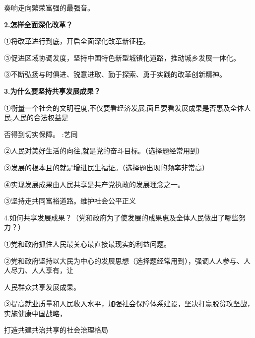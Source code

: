 \documentclass[lang=cn,11pt]{elegantbook}
\newcommand{\daofasym}[1]{{\daofasymbolfont #1}}
\newcommand{\daofasym}[1]{#1}
\begin{document}
奏响走向繁荣富强的最强音。\par

\textbf{2.怎样全面深化改革？}\par

\daofasym{①}将改革进行到底，开启全面深化改革新征程。\par

\daofasym{③}促进区域协调发度，坚持中国特色新型城镇化道路，推动城乡发展一体化。\par

\daofasym{③}不断弘扬与时俱进、锐意进取、勤于探索、勇于实践的改革创新精神。\par

\textbf{3.为什么要坚持共享发展成果？}\par

\daofasym{①}衡量一个社会的文明程度,不仅要看经济发展,面且要看发展成果是否惠及全体人民,人民的合法权益是\par

否得到切实保障。 :艺同\par

\daofasym{②}人民对美好生活的向往,就是党的奋斗目标。（选择题经常用到）\par

\daofasym{③}发展的根本且的就是增进民生福证。（选择题出现的频率非常高）\par

\daofasym{④}实现发展成果由人民共享是共产党执政的发展理念之一。\par

\daofasym{③}坚持走共同富裕道路。维护社会公平正义\par

4.如何共享发展成果？（党和政府为了使发展的成果惠及全体人民做出了哪些努力？）\par

\daofasym{①}党和政府抓住人民最关心最直接最现实的利益问题。\par

\daofasym{②}党和政府坚持以大民为中心的发展思想（选择题经常用到），强调人人参与、人人尽力、人人享有，让\par

人民群众共享发展成果。\par

\daofasym{③}提高就业质量和人民收入水平，加强社会保障体系建设，坚决打赢脱贫攻坚战，实施健康中国战略，\par

打造共建共治共享的社会治理格局\par
\end{document}
